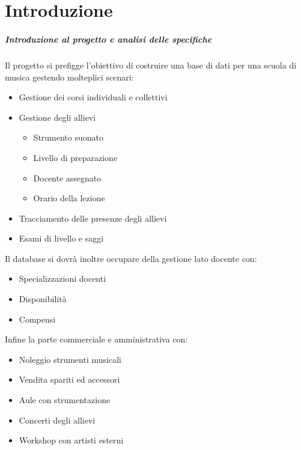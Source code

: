\chapter{Introduzione}
\paragraph{Introduzione al progetto e analisi delle specifiche} Il progetto si prefigge l'obiettivo di costruire una base di dati per una scuola di musica gestendo molteplici scenari: 
\begin{itemize}
    \item Gestione dei corsi individuali e collettivi 
    \item Gestione degli allievi
    \begin{itemize}
        \item Strumento suonato 
        \item Livello di preparazione  
        \item Docente assegnato
        \item Orario della lezione
    \end{itemize}
    \item Tracciamento delle presenze degli allievi 
    \item Esami di livello e saggi
\end{itemize}
Il database si dovrà inoltre occupare della gestione lato docente con: 
\begin{itemize}
    \item Specializzazioni docenti
    \item Disponibilità 
    \item Compensi
\end{itemize}
\newpage
Infine la parte commerciale e amministrativa con: 
\begin{itemize}
    \item Noleggio strumenti musicali 
    \item Vendita spariti ed accessori 
    \item Aule con strumentazione 
    \item Concerti degli allievi 
    \item Workshop con artisti esterni
\end{itemize}
